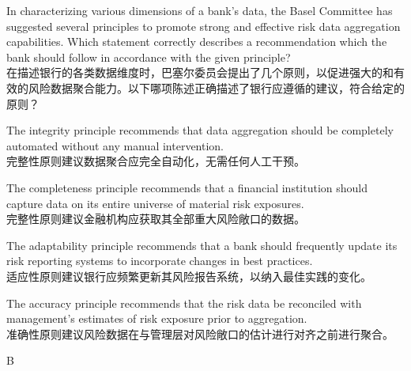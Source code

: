 \documentclass{article}
\newcounter{question} %
\begin{document}
\begin{question}
    In characterizing various dimensions of a bank's data, the Basel Committee has suggested several principles to promote strong and effective risk data aggregation capabilities. Which statement correctly describes a recommendation which the bank should follow in accordance with the given principle?
    \\在描述银行的各类数据维度时，巴塞尔委员会提出了几个原则，以促进强大的和有效的风险数据聚合能力。以下哪项陈述正确描述了银行应遵循的建议，符合给定的原则？
\end{question}

\begin{choices}
    \item The integrity principle recommends that data aggregation should be completely automated without any manual intervention.\\完整性原则建议数据聚合应完全自动化，无需任何人工干预。
    \item The completeness principle recommends that a financial institution should capture data on its entire universe of material risk exposures.\\完整性原则建议金融机构应获取其全部重大风险敞口的数据。
    \item The adaptability principle recommends that a bank should frequently update its risk reporting systems to incorporate changes in best practices.\\适应性原则建议银行应频繁更新其风险报告系统，以纳入最佳实践的变化。
    \item The accuracy principle recommends that the risk data be reconciled with management's estimates of risk exposure prior to aggregation.\\准确性原则建议风险数据在与管理层对风险敞口的估计进行对齐之前进行聚合。
\end{choices}

\begin{correctanswer}
    B
\end{correctanswer}
\end{document}
